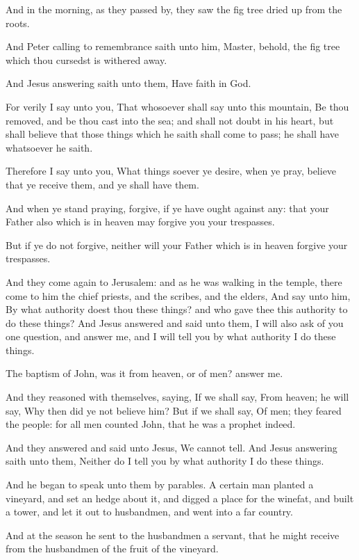 \Verse And in the morning, as they passed by, they saw the fig tree dried up from the roots.

\Verse And Peter calling to remembrance saith unto him, Master, behold, the fig tree which thou cursedst is withered away.

\Verse And Jesus answering saith unto them, Have faith in God.

\Verse For verily I say unto you, That whosoever shall say unto this mountain, Be thou removed, and be thou cast into the sea; and shall not doubt in his heart, but shall believe that those things which he saith shall come to pass; he shall have whatsoever he saith.

\Verse Therefore I say unto you, What things soever ye desire, when ye pray, believe that ye receive them, and ye shall have them.

\Verse And when ye stand praying, forgive, if ye have ought against any: that your Father also which is in heaven may forgive you your trespasses.

\Verse But if ye do not forgive, neither will your Father which is in heaven forgive your trespasses.

\Verse And they come again to Jerusalem: and as he was walking in the temple, there come to him the chief priests, and the scribes, and the elders, \Verse And say unto him, By what authority doest thou these things? and who gave thee this authority to do these things?  \Verse And Jesus answered and said unto them, I will also ask of you one question, and answer me, and I will tell you by what authority I do these things.

\Verse The baptism of John, was it from heaven, or of men? answer me.

\Verse And they reasoned with themselves, saying, If we shall say, From heaven; he will say, Why then did ye not believe him?  \Verse But if we shall say, Of men; they feared the people: for all men counted John, that he was a prophet indeed.

\Verse And they answered and said unto Jesus, We cannot tell. And Jesus answering saith unto them, Neither do I tell you by what authority I do these things.


\Chapter
\Verse And he began to speak unto them by parables. A certain man planted a vineyard, and set an hedge about it, and digged a place for the winefat, and built a tower, and let it out to husbandmen, and went into a far country.

\Verse And at the season he sent to the husbandmen a servant, that he might receive from the husbandmen of the fruit of the vineyard.

